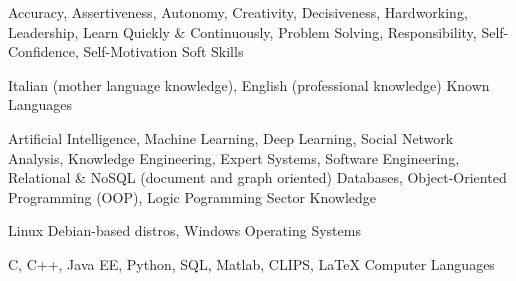

\begin{cventries}

  \cventry
      {Accuracy, Assertiveness, Autonomy, Creativity, Decisiveness, Hardworking, Leadership, Learn Quickly \& Continuously, Problem Solving, Responsibility, Self-Confidence, Self-Motivation}
    {Soft Skills}
    {}
    {}
    {}

  \cventry
    {Italian (mother language knowledge), English (professional knowledge)}
    {Known Languages}
    {}
    {}
    {}

  \cventry
    {Artificial Intelligence, Machine Learning, Deep Learning, Social Network Analysis, Knowledge Engineering, Expert Systems, Software Engineering, Relational \& NoSQL (document and graph oriented) Databases, Object-Oriented Programming (OOP), Logic Pogramming}
    {Sector Knowledge}
    {}
    {}
    {}

  \cventry
    {Linux Debian-based distros, Windows}
    {Operating Systems}
    {}
    {}
    {}

  \cventry
    {C, C++, Java EE, Python, SQL, Matlab, CLIPS, LaTeX}
    {Computer Languages}
    {}
    {}
    {}


\end{cventries}

